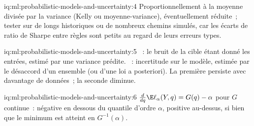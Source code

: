 \begin{solution}{iq:ml:probabilistic-models-and-uncertainty:4}
Proportionnellement à la moyenne divisée par la variance (Kelly ou moyenne-variance), éventuellement réduite~; tester sur de longs historiques ou de nombreux
chemins simulés, car les écarts de ratio de Sharpe entre règles sont petits au regard de leurs erreurs types.
\end{solution}

\begin{solution}{iq:ml:probabilistic-models-and-uncertainty:5}
~: le bruit de la cible étant donné les entrées, estimé par une variance prédite. ~: incertitude sur le
modèle, estimée par le désaccord d'un ensemble (ou d'une loi a posteriori). La première persiste avec davantage de données~; la seconde diminue.
\end{solution}

\begin{solution}{iq:ml:probabilistic-models-and-uncertainty:6}
$\frac{d}{dq}\E\ell_\alpha(Y, q) = G(q) - \alpha$ pour $G$ continue~: négative en dessous du quantile d'ordre $\alpha$, positive au-dessus, si bien que
le minimum est atteint en $G^{-1}(\alpha)$.
\end{solution}
